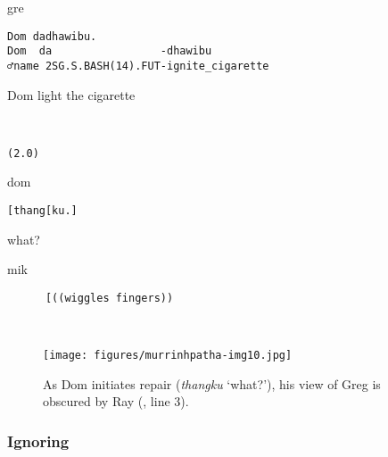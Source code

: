 \documentclass[output=paper,nonflat,colorlinks,citecolor=brown]{langsci/langscibook}
\begin{document}
\vspace{-1mm}
%
\begin{mdframednoverticalspace}[style=firstfoc]
\begin{transbox}{1}{gre}
\begin{verbatim}
Dom dadhawibu.
Dom  da                 -dhawibu
♂name 2SG.S.BASH(14).FUT-ignite_cigarette
\end{verbatim}
Dom light the cigarette
\end{transbox}
\end{mdframednoverticalspace}
%
\begin{transbox}{2}{~}
\begin{verbatim}
(2.0)
\end{verbatim}
\end{transbox}
%
\begin{mdframednoverticalspace}[style=secondfoc]
\begin{transbox}{3}{dom}
\begin{verbatim}
[thang[ku.]
\end{verbatim}
\hspace{0.07cm} what?
\end{transbox}
\end{mdframednoverticalspace}
%
\begin{mdframednoverticalspace}[style=secondfoc]
\end{mdframednoverticalspace}
%
\begin{transbox}{5}{mik}
\begin{verbatim}
      [((wiggles fingers))
\end{verbatim}
\end{transbox}
%
%
\\

\begin{figure}
\texttt{[image: figures/murrinhpatha-img10.jpg]}
\caption{
As Dom initiates repair (\textit{thangku} ‘what?’), his view of Greg is obscured by Ray (, line 3).
\label{fig:blythe:10}}
\end{figure}

\subsubsection{Ignoring}\label{sec:blythe:4.2.4}
\end{document}
